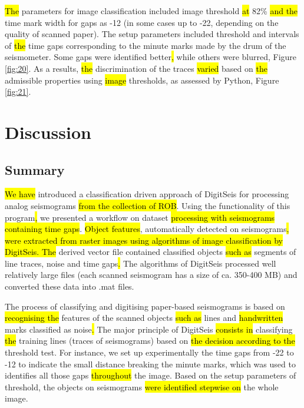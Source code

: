 \documentclass[sensors,article,submit,moreauthors,pdftex]{Definitions/mdpi}
\begin{document}
\hl{The }parameters for image classification included image threshold \hl{at }82\%\hl{ and the }time mark width for gaps as -12 (in some cases up to -22, depending on the quality of scanned paper). The setup parameters included threshold and intervals of \hl{the }time gaps corresponding to the minute marks made by the drum of the seismometer. Some gaps were identified better\hl{, }while others\hl{ }were blurred, Figure \ref{fig:20}. As a results, \hl{the }discrimination of the traces \hl{varied }based on \hl{the }admissible properties using \hl{image }thresholds, as assessed by Python, Figure \ref{fig:21}. 

\section{Discussion}

\subsection{Summary}
\hl{We have }introduced a classification driven approach of DigitSeis for processing analog seismograms \hl{from the collection of ROB}. Using the functionality of this program\hl{, }we presented a workflow\hl{ }on dataset\hl{ processing with seismograms containing time gaps}. \hl{Object features}, automatically detected on seismograms\hl{, were extracted from raster images using algorithms of image classification by DigitSeis. The }derived\hl{ }vector file contained\hl{ }classified objects \hl{such as }segments of line traces, noise and time gaps\hl{. }The algorithms of DigitSeis processed well relatively large files (each scanned seismogram has a size of ca. 350-400 MB) and converted these data into .mat files. 

The process of classifying and digitising paper-based seismograms is based on \hl{recognising the }features of the scanned objects \hl{such as }lines and\hl{ handwritten }marks\hl{ }classified as noise\hl{. }The major principle of DigitSeis \hl{consists in }classifying \hl{the }training lines (traces of seismograms) based on \hl{the decision according to the }threshold test. For instance, we set up experimentally the time gaps from -22 to -12 to indicate the small distance breaking the minute marks, which was used\hl{ }to identifies all those gaps \hl{throughout }the image. Based on the setup parameters of threshold, the\hl{ }objects on seismograms \hl{were identified stepwise on }the whole image.
\end{document}
